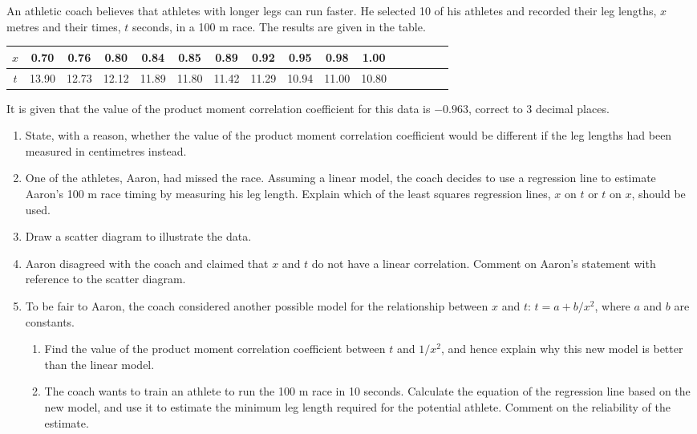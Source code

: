 \begin{problem}
    An athletic coach believes that athletes with longer legs can run faster. He selected 10 of his athletes and recorded their leg lengths, $x$ metres and their times, $t$ seconds, in a 100 m race. The results are given in the table.
        
    \begin{table}[H]
        \centering
        \begin{tabular}{|c|c|c|c|c|c|c|c|c|c|c|c|c|c|c|c|} \hline
            $x$ & 0.70 & 0.76 & 0.80 & 0.84 & 0.85 & 0.89 & 0.92 & 0.95 & 0.98 & 1.00 \\ \hline
            $t$ & 13.90 & 12.73 & 12.12 & 11.89 & 11.80 & 11.42 & 11.29 & 10.94 & 11.00 & 10.80 \\ \hline
        \end{tabular}
    \end{table}

    It is given that the value of the product moment correlation coefficient for this data is $-0.963$, correct to 3 decimal places.

    \begin{enumerate}
        \item State, with a reason, whether the value of the product moment correlation coefficient would be different if the leg lengths had been measured in centimetres instead.
        \item One of the athletes, Aaron, had missed the race. Assuming a linear model, the coach decides to use a regression line to estimate Aaron's 100 m race timing by measuring his leg length. Explain which of the least squares regression lines, $x$ on $t$ or $t$ on $x$, should be used.
        \item Draw a scatter diagram to illustrate the data.
        \item Aaron disagreed with the coach and claimed that $x$ and $t$ do not have a linear correlation. Comment on Aaron's statement with reference to the scatter diagram.
        \item To be fair to Aaron, the coach considered another possible model for the relationship between $x$ and $t$: $t= a + b/x^2$, where $a$ and $b$ are constants.
        \begin{enumerate}
            \item Find the value of the product moment correlation coefficient between $t$ and $1/x^2$, and hence explain why this new model is better than the linear model.
            \item The coach wants to train an athlete to run the 100 m race in 10 seconds. Calculate the equation of the regression line based on the new model, and use it to estimate the minimum leg length required for the potential athlete. Comment on the reliability of the estimate.
        \end{enumerate}
    \end{enumerate}
\end{problem}
